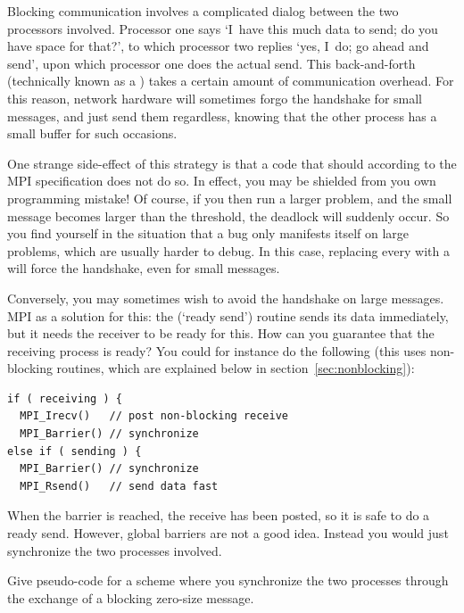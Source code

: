 Blocking communication involves a complicated dialog between the two
processors involved. Processor one says `I~have this much data to
send; do you have space for that?', to which processor two replies
`yes, I~do; go ahead and send', upon which processor one does the
actual send. This back-and-forth (technically known as
a ) takes a certain amount of communication
overhead. For this reason, network hardware will sometimes forgo the
handshake for small messages, and just send them regardless, knowing
that the other process has a small buffer for such occasions.


One strange side-effect of this strategy is that a code that
should  according to the MPI specification does
not do so. In effect, you may be shielded from you own programming
mistake! Of course, if you then run a larger problem, and the small
message becomes larger than the threshold, the deadlock will suddenly
occur. So you find yourself in the situation that a bug only manifests
itself on large problems, which are usually harder to debug. In this
case, replacing every  with a  will force the
handshake, even for small messages.

Conversely, you may sometimes wish to avoid the handshake on large
messages. MPI as a solution for this: the  (`ready
send') routine sends its data immediately, but it needs the receiver
to be ready for this. How can you guarantee that the receiving process
is ready? You could for instance do the following (this uses
non-blocking routines, which are explained below in
section~\ref{sec:nonblocking}):
\begin{verbatim}
if ( receiving ) {
  MPI_Irecv()   // post non-blocking receive
  MPI_Barrier() // synchronize
else if ( sending ) {
  MPI_Barrier() // synchronize
  MPI_Rsend()   // send data fast
\end{verbatim}
When the barrier is reached, the receive has been posted, so it is safe 
to do a ready send. However, global barriers are not a good idea.
Instead you would just synchronize the two processes involved.
\begin{exercise}
  Give pseudo-code for a scheme where you synchronize the two
  processes through the exchange of a blocking zero-size message.
\end{exercise}

